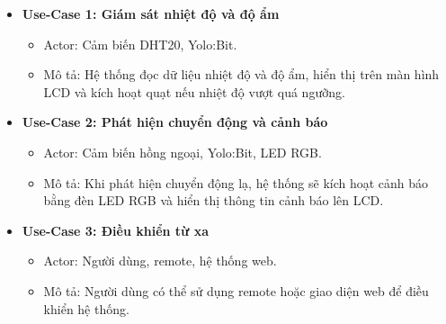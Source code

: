\begin{itemize}
    \item \textbf{Use-Case 1: Giám sát nhiệt độ và độ ẩm}
          \begin{itemize}
              \item Actor: Cảm biến DHT20, Yolo:Bit.
              \item Mô tả: Hệ thống đọc dữ liệu nhiệt độ và độ ẩm, hiển thị trên màn hình LCD và kích hoạt quạt nếu nhiệt độ vượt quá ngưỡng.
          \end{itemize}
    \item \textbf{Use-Case 2: Phát hiện chuyển động và cảnh báo}
          \begin{itemize}
              \item Actor: Cảm biến hồng ngoại, Yolo:Bit, LED RGB.
              \item Mô tả: Khi phát hiện chuyển động lạ, hệ thống sẽ kích hoạt cảnh báo bằng đèn LED RGB và hiển thị thông tin cảnh báo lên LCD.
          \end{itemize}
    \item \textbf{Use-Case 3: Điều khiển từ xa}
          \begin{itemize}
              \item Actor: Người dùng, remote, hệ thống web.
              \item Mô tả: Người dùng có thể sử dụng remote hoặc giao diện web để điều khiển hệ thống.
          \end{itemize}

\end{itemize}